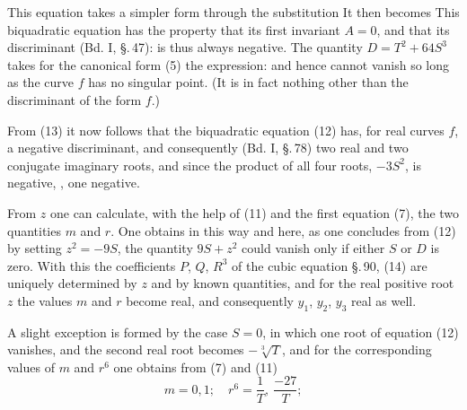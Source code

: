 
This equation takes a simpler form through the
substitution
It then becomes
This biquadratic equation has the property that
its first invariant $A=0$, and that its discriminant
(Bd. I, \S.\,47):
is thus always negative. The quantity $D=T^2+64S^3$ takes for
the canonical form (5) the expression:
and hence cannot vanish so long as the curve $f$ has no
singular point. (It is in fact nothing other than
the discriminant of the form $f$.)

From (13) it now follows that the biquadratic equation
 (12) has, for real curves $f$, a negative discriminant, and
consequently (Bd. I, \S.\,78) two real and two conjugate imaginary
roots, and since the product of all four roots, $-3S^2$,
is negative, ,
one negative.

From $z$ one can calculate, with the help of (11) and the first equation
 (7), the two quantities $m$ and $r$. One obtains in this way
and here, as one concludes from (12) by setting
$z^2=-9S$, the quantity $9S+z^2$ could vanish only if either
 $S$ or $D$ is zero. With this the coefficients $P$, $Q$, $R^3$
of the cubic equation \S.\,90, (14) are uniquely determined by $z$ and by
known quantities, and for the real positive root $z$
the values $m$ and $r$ become real, and consequently $y_1$, $y_2$, $y_3$ real as well.

A slight exception is formed by the case $S=0$, in which one
root of equation (12) vanishes, and the second real
root becomes $-\sqrt[3]{T}$, and for the corresponding values of $m$
and $r^6$ one obtains from (7) and (11)
\[
m = 0, 1; \quad r^6 = \frac{1}{T}, \ \frac{-27}{T};
\]
